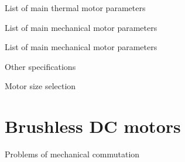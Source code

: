 \documentclass[compress]{beamer}
\begin{document}
{
    \begin{frame}{List of main thermal motor parameters}
    \end{frame}
}

{
    \begin{frame}{List of main mechanical motor parameters}
    \end{frame}
}

{
    \begin{frame}{List of main mechanical motor parameters}
    \end{frame}
}

{
    \begin{frame}{Other specifications}
    \end{frame}
}


{
    \begin{frame}{Motor size selection}
    \end{frame}
}

\section{Brushless DC motors}

{
\begin{frame}{Problems of mechanical commutation}

%
%

\end{frame}
}
\end{document}

